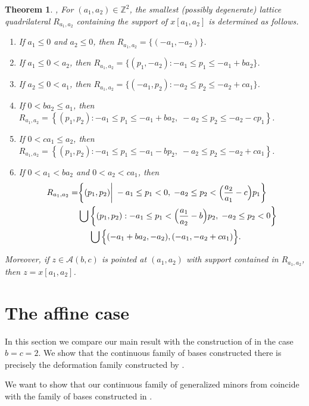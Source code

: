 \documentclass{amsart}
\newtheorem{theorem}{Theorem}
\numberwithin{theorem}{section}
\newcommand{\cA}{\mathcal{A}}
\newcommand{\ZZ}{\mathbb{Z}}
\begin{document}
  \begin{theorem}\label{th:Newton polygons}\cite[Proposition~4.1]{LLZ}, \cite[Corollary~3.5]{LLZ2}
    For $(a_1,a_2)\in\ZZ^2$, the smallest (possibly degenerate) lattice quadrilateral $R_{a_1,a_2}$ containing the support of $x[a_1,a_2]$ is determined as follows.
    \begin{enumerate}
      \item If $a_1 \leq 0$ and $a_2 \leq 0$, then $R_{a_1,a_2} = \{(-a_1,-a_2)\}$.
      \item If $a_1 \leq 0 < a_2$, then $R_{a_1,a_2} = \{(p_1,-a_2): -a_1\leq p_1\leq -a_1+ba_2\}$.
      \item If $a_2 \leq 0 < a_1$, then $R_{a_1,a_2} = \{(-a_1,p_2): -a_2 \leq p_2 \leq -a_2+ca_1\}$.
      \item If $0<ba_2\leq a_1$, then $R_{a_1,a_2}=\left\{(p_1,p_2): -a_1\le p_1\le -a_1+ba_2,\; -a_2\le p_2\le -a_2-cp_1\right\}$.
      \item If $0<ca_1\leq a_2$, then $R_{a_1,a_2}=\left\{(p_1,p_2): -a_1\le p_1\le -a_1-bp_2,\; -a_2\le p_2\le -a_2+ca_1\right\}$.
      \item If $0 < a_1 < ba_2$ and $0 < a_2 < ca_1$, then
      $$\aligned
      R_{a_1,a_2}=&\bigg\{(p_1,p_2)\bigg|\; -a_1\le p_1<0,\; -a_2\le p_2<\Big(\frac{a_2}{a_1}-c\Big)p_1\bigg\}\\
      &\bigcup\bigg\{(p_1,p_2): -a_1\le p_1<\Big(\frac{a_1}{a_2}-b\Big)p_2,\; -a_2\le p_2<0\bigg\}\\
      &\hspace{1.35em}\bigcup\Big\{(-a_1+ba_2,-a_2),(-a_1,-a_2+ca_1)\Big\}.
      \endaligned
      $$
    \end{enumerate}
    Moreover, if $z\in\cA(b,c)$ is pointed at $(a_1,a_2)$ with support contained in $R_{a_1,a_2}$, then $z=x[a_1,a_2]$. 
  \end{theorem}

\section{The affine case}
  \label{sec:affine}
  In this section we compare our main result with the construction of \cite{RSW19} in the case $b=c=2$.
  We show that the continuous family of bases constructed there is precisely the deformation family constructed by \cite{Qin}.


  We want to show that our continuous family of generalized minors from \cite[Theorem 4.6]{RSW19} coincide with the family of bases constructed in \cite[Theorem 1.2.1]{Qin19}.
  
\end{document}
